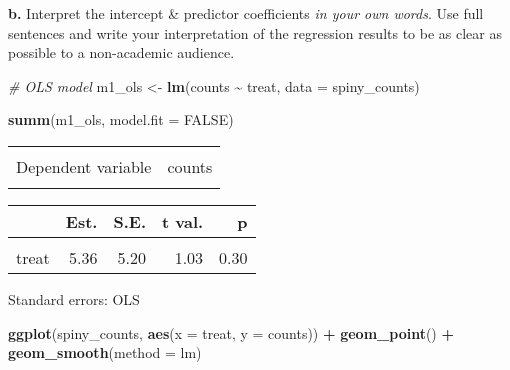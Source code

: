 \documentclass[
]{article}
\newenvironment{Shaded}{\begin{snugshade}}{\end{snugshade}}
\newcommand{\AttributeTok}[1]{\textcolor[rgb]{0.13,0.29,0.53}{#1}}
\newcommand{\CommentTok}[1]{\textcolor[rgb]{0.56,0.35,0.01}{\textit{#1}}}
\newcommand{\ConstantTok}[1]{\textcolor[rgb]{0.56,0.35,0.01}{#1}}
\newcommand{\FunctionTok}[1]{\textcolor[rgb]{0.13,0.29,0.53}{\textbf{#1}}}
\newcommand{\NormalTok}[1]{#1}
\newcommand{\OtherTok}[1]{\textcolor[rgb]{0.56,0.35,0.01}{#1}}
\newcommand{\SpecialCharTok}[1]{\textcolor[rgb]{0.81,0.36,0.00}{\textbf{#1}}}
\begin{document}
\textbf{b.} Interpret the intercept \& predictor coefficients \emph{in
your own words}. Use full sentences and write your interpretation of the
regression results to be as clear as possible to a non-academic
audience.

\begin{Shaded}
\begin{Highlighting}[]
\CommentTok{\# OLS model }
\NormalTok{m1\_ols }\OtherTok{\textless{}{-}} \FunctionTok{lm}\NormalTok{(counts }\SpecialCharTok{\textasciitilde{}}\NormalTok{ treat, }\AttributeTok{data =}\NormalTok{ spiny\_counts)}

\FunctionTok{summ}\NormalTok{(m1\_ols, }\AttributeTok{model.fit =} \ConstantTok{FALSE}\NormalTok{) }
\end{Highlighting}
\end{Shaded}

\begin{table}[!h]
\centering
\begin{tabular}{lr}
\toprule
\cellcolor{gray!10}{Observations} & \cellcolor{gray!10}{252}\\
Dependent variable & counts\\
\cellcolor{gray!10}{Type} & \cellcolor{gray!10}{OLS linear regression}\\
\bottomrule
\end{tabular}
\end{table}  \begin{table}[!h]
\centering
\begin{threeparttable}
\begin{tabular}{lrrrr}
\toprule
  & Est. & S.E. & t val. & p\\
\midrule
\cellcolor{gray!10}{(Intercept)} & \cellcolor{gray!10}{22.73} & \cellcolor{gray!10}{3.57} & \cellcolor{gray!10}{6.36} & \cellcolor{gray!10}{0.00}\\
treat & 5.36 & 5.20 & 1.03 & 0.30\\
\bottomrule
\end{tabular}
\begin{tablenotes}
\item Standard errors: OLS
\end{tablenotes}
\end{threeparttable}
\end{table}

\begin{Shaded}
\begin{Highlighting}[]
\FunctionTok{ggplot}\NormalTok{(spiny\_counts, }\FunctionTok{aes}\NormalTok{(}\AttributeTok{x =}\NormalTok{ treat, }\AttributeTok{y =}\NormalTok{ counts)) }\SpecialCharTok{+}
    \FunctionTok{geom\_point}\NormalTok{() }\SpecialCharTok{+}
    \FunctionTok{geom\_smooth}\NormalTok{(}\AttributeTok{method =}\NormalTok{ lm)}
\end{Highlighting}
\end{Shaded}
\end{document}

